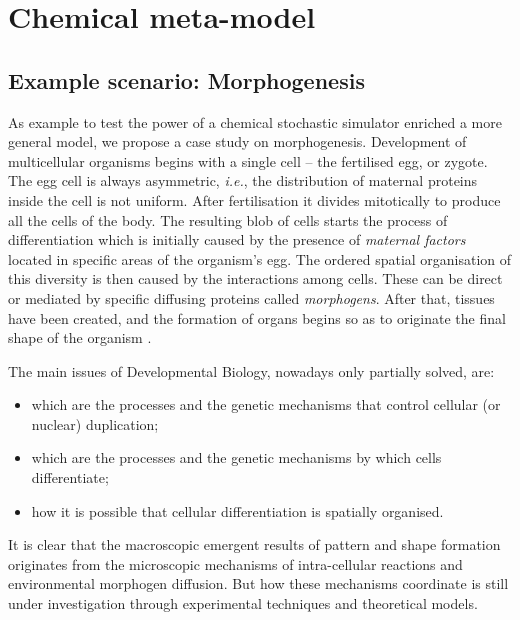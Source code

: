 \documentclass[12pt,a4paper,twoside,openright]{book}
\begin{document}
\chapter{Chemical meta-model}


\section{Example scenario: Morphogenesis}

As example to test the power of a chemical stochastic simulator enriched a more general model, we propose a case study on morphogenesis.
%
Development of multicellular organisms begins with a single cell -- the fertilised egg, or zygote.
%
The egg cell is always asymmetric, \emph{i.e.}, the distribution of maternal proteins inside the cell is not uniform.
%
After fertilisation it divides mitotically to produce all the cells of the body. 
%
The resulting blob of cells starts the process of differentiation which is initially caused by the presence of \emph{maternal factors} located in specific areas of the organism's egg.
%
The ordered spatial organisation of this diversity is then caused by the interactions among cells. These can be direct or mediated by specific diffusing proteins called \emph{morphogens}. 
%
After that, tissues have been created, and the formation of organs begins so as to originate the final shape of the organism \cite{alberts, gilbert2006-devbio}. 

The main issues of Developmental Biology, nowadays only partially solved, are:
\begin{itemize}
 \item which are the processes and the genetic mechanisms that control cellular (or nuclear) duplication;
 \item which are the processes and the genetic mechanisms by which cells differentiate;
 \item how it is possible that cellular differentiation is spatially organised.
\end{itemize}

It is clear that the macroscopic emergent results of pattern and shape formation originates from the microscopic mechanisms of intra-cellular reactions and environmental morphogen diffusion.
%
But how these mechanisms coordinate is still under investigation through experimental techniques and theoretical models.
\end{document}
